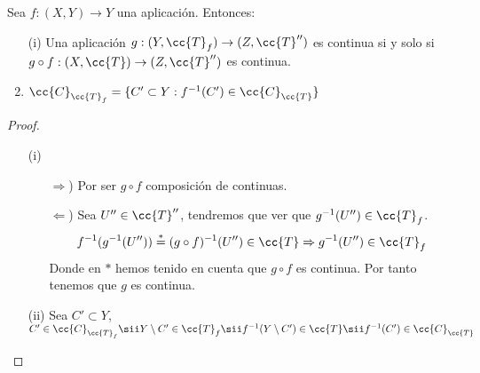 \begin{prop}
    Sea $f:(X,Y)\to Y$ una aplicación. Entonces:
    \begin{enumerate}
        \item[(i)] Una aplicación $g:(Y, \cc{T}_f)\to (Z, \cc{T}'')$ es continua si y solo si $g\circ f:(X, \cc{T})\to (Z, \cc{T}'')$ es continua.
        \begin{center}
        \end{center}
        \item $\cc{C}_{\cc{T}_f}=\{C'\subset Y : f^{-1}(C')\in \cc{C}_{\cc{T}}\}$
    \end{enumerate}
    \begin{proof}\
        \begin{enumerate}
            \item[(i)] 
            \begin{itemize}
                \item[$\Rightarrow$)] Por ser $g\circ f$ composición de continuas.
                \item[$\Leftarrow$)] Sea $U''\in \cc{T}''$, tendremos que ver que $g^{-1}(U'')\in \cc{T}_f$.
                \begin{align*}
                    f^{-1}(g^{-1}(U'')) \overset{\ast}{=} (g\circ f)^{-1}(U'')\in \cc{T}\Rightarrow g^{-1}(U'')\in \cc{T}_f
                \end{align*}
                Donde en $\ast$ hemos tenido en cuenta que $g\circ f$ es continua. Por tanto tenemos que $g$ es continua.
            \end{itemize}
            \item[(ii)] Sea $C'\subset Y$, $C'\in \cc{C}_{\cc{T}_f}\sii Y\setminus C' \in \cc{T}_f \sii f^{-1}(Y\setminus C')\in \cc{T} \sii f^{-1}(C')\in \cc{C}_{\cc{T}}$
        \end{enumerate}
    \end{proof}
\end{prop}

